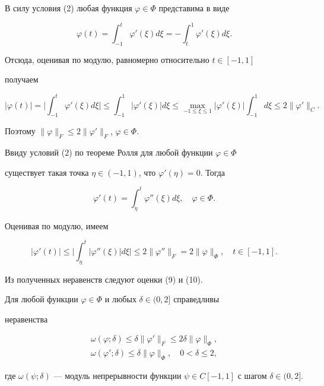 \begin{pf} 


В силу условия (2) любая функция $\varphi\in\Phi$ представима в виде 


$$ 


\varphi(t)=\int^t_{-1}\varphi'(\xi)d\xi=-\int^1_t 


\varphi'(\xi)d\xi. 


$$ 


Отсюда, оценивая по модулю, равномерно относительно $t\in[-1,1]$ 


получаем 


$$ 


|\varphi(t)|=\bigg|\int^t_{-1}\varphi'(\xi)d\xi\bigg|\le 


\int^1_{-1}|\varphi'(\xi)|d\xi\le\max_{-1\le\xi\le1} 


|\varphi'(\xi)|\int^1_{-1}d\xi\le2\|\varphi'\|_C. 


$$ 


Поэтому $\|\varphi\|_F\le2\|\varphi'\|_F$, $\varphi\in\Phi$. 


 


Ввиду условий (2) по теореме Ролля для любой функции $\varphi\in\Phi$ 


существует такая точка $\eta\in(-1,1)$, что $\varphi'(\eta)=0$. Тогда 


$$ 


\varphi'(t)=\int^t_\eta \varphi''(\xi)d\xi,\quad \varphi\in\Phi. 


$$ 


Оценивая по модулю, имеем 


$$ 


|\varphi'(t)|\le\bigg|\int^t_\eta|\varphi''(\xi)|d\xi\bigg|\le 


2\|\varphi''\|_F=2\|\varphi\|_\Phi,\quad t\in[-1,1]. 


$$ 


Из полученных неравенств следуют оценки (9) и (10). 


\end{pf} 


 


\begin{lem} 


Для любой функции $\varphi\in\Phi$ и любых $\delta\in(0,2]$ справедливы 


неравенства 


\begin{gather} 


\omega(\varphi;\delta)\le\delta\|\varphi'\|_F\le2\delta 


\|\varphi\|_\Phi, \\ 


% 


\omega(\varphi';\delta)\le\delta\|\varphi\|_\Phi,\quad 0<\delta\le2, 


\end{gather} 


где $\omega(\psi;\delta)$ --- модуль непрерывности функции $\psi\in 


C[-1,1]$ с шагом $\delta\in(0,2]$. 


\end{lem} 


